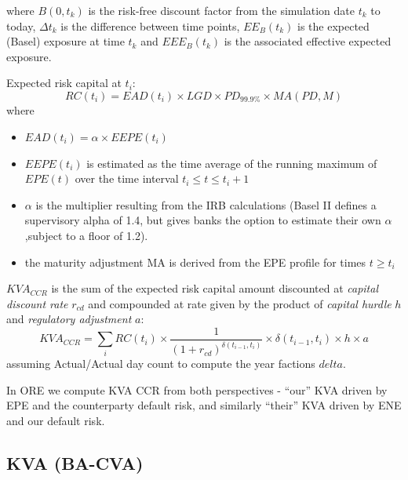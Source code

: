 \documentclass[12pt, a4paper]{article}
\newcommand{\KVA}{\mathit{KVA}}
\newcommand{\EE}{\mathit{EE}}
\newcommand{\EPE}{\mathit{EPE}}
\newcommand{\EEPE}{\mathit{EEPE}}
\newcommand{\EEE}{\mathit{EEE}}
\newcommand{\EAD}{\mathit{EAD}}
\newcommand{\RC}{\mathit{RC}}
\newcommand{\PD}{\mathit{PD}}
\newcommand{\MA}{\mathit{MA}}
\begin{document}
{\begin{appendix}
\medskip where $B(0,t_k)$ is the risk-free discount factor from the
simulation  date $t_k$ to today, $\Delta t_k$ is the difference
between time points, 
$\EE_B(t_k)$ is the expected (Basel) exposure at time $t_k$ and $\EEE_B(t_k)$ is the
associated effective expected exposure.

\medskip 
Expected risk capital at $t_i$:
$$
\RC(t_i) = EAD(t_i) \times LGD \times \PD_{99.9\%} \times \MA(\PD, M)
$$
where
\begin{itemize}
\item $\EAD(t_i) = \alpha \times \EEPE(t_i)$
\item $\EEPE(t_i)$ is estimated as the time average of the running maximum of $\EPE(t)$ over the time interval $t_i\leq t\leq t_i+1$
\item $\alpha$ is the multiplier resulting from the IRB calculations (Basel II defines a supervisory alpha of 1.4, but gives banks the option to estimate their own $\alpha$,subject to a floor of 1.2).
\item the maturity adjustment MA is derived from the EPE profile for times $t\geq t_i$
\end{itemize}

\medskip 
$\KVA_{CCR}$ is the sum of the expected risk capital amount discounted at {\em capital discount rate} $r_{cd}$ and compounded at rate given by the product of {\em capital hurdle} $h$ and {\em regulatory adjustment} $a$:
$$
\KVA_{CCR} = \sum_i \RC(t_i) \times \frac{1}{ (1 + r_{cd})^{\delta(t_{i-1}, t_i)}} \times \delta(t_{i-1}, t_i) \times h \times a
$$
assuming Actual/Actual day count to compute the year factions $delta$.

In ORE we compute KVA CCR from both perspectives - ``our'' KVA driven by EPE and the counterparty default risk, and similarly ``their'' KVA driven by ENE and our default risk.

\subsection{KVA (BA-CVA)}\label{sec:app_kva_cva}


\end{appendix}}
\end{document}
